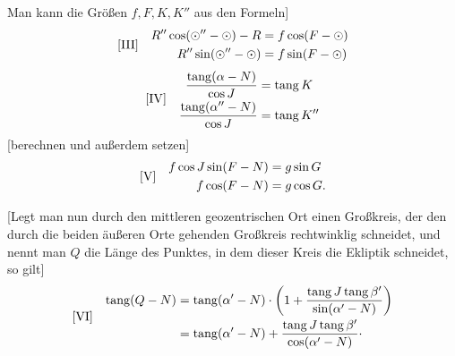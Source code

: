 Man kann die Größen \(f,F,K,K''\) aus den Formeln]
\[
\begin{array}{l@{\quad}l}
[\mathrm{III}]&\begin{aligned}
R''\cos(\odot''-\odot)-R&=f\cos(F-\odot)\\
R''\sin(\odot''-\odot)&=f\sin(F-\odot)
\end{aligned}
\end{array}
\]
\[
\begin{array}{l@{\quad}l}
[\mathrm{IV}]&\begin{aligned}
\frac{\operatorname{tang}(\alpha-N)}{\cos J}&=\operatorname{tang}K\\
\frac{\operatorname{tang}(\alpha''-N)}{\cos J}&=\operatorname{tang}K''
\end{aligned}
\end{array}
\]
[berechnen und außerdem setzen]
\[
\begin{array}{l@{\quad}l}
[\mathrm{V}]&\begin{aligned}
f\cos J\sin(F-N)&=g\sin G\\
f\cos(F-N)&=g\cos G.
\end{aligned}
\end{array}
\]

[Legt man nun durch den mittleren geozentrischen Ort einen Großkreis, der den durch die beiden äußeren Orte gehenden Großkreis rechtwinklig schneidet, und nennt man \(Q\) die Länge des Punktes, in dem dieser Kreis die Ekliptik schneidet, so gilt]
\[
\begin{array}{l@{\quad}l}
[\mathrm{VI}]&\begin{aligned}
\operatorname{tang}(Q-N)&=\operatorname{tang}(\alpha'-N)\cdot\left(1+\frac{\operatorname{tang}J\operatorname{tang}\beta'}{\sin(\alpha'-N)}\right)\\
&=\operatorname{tang}(\alpha'-N)+\frac{\operatorname{tang}J\operatorname{tang}\beta'}{\cos(\alpha'-N)}\mathpunct{\cdot}
\end{aligned}
\end{array}
\]

